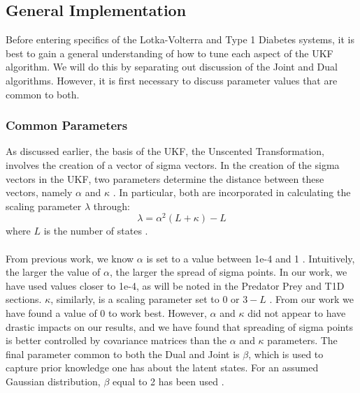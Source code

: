 
\subsection{General Implementation} \label{KF_General_Implementation}
Before entering specifics of the Lotka-Volterra and Type 1 Diabetes systems, it is best to gain a general understanding of how to tune each aspect of the UKF algorithm. We will do this by separating out discussion of the Joint and Dual algorithms. However, it is first necessary to discuss parameter values that are common to both.

\subsubsection{Common Parameters} \label{noise_UKF}
As discussed earlier, the basis of the UKF, the Unscented Transformation, involves the creation of a vector of sigma vectors. In the creation of the sigma vectors in the UKF, two parameters determine the distance between these vectors, namely $\alpha$ and $\kappa$ \cite{VanMereChapter}. In particular, both are incorporated in calculating the scaling parameter $\lambda$ through:
\begin{equation}
\lambda = \alpha^2 (L + \kappa) - L
\end{equation}
where $L$ is the number of states \cite{VanMereChapter}.\\
\\

From previous work, we know $\alpha$ is set to a value between 1e-4 and 1 \cite{VanMereChapter}. Intuitively, the larger the value of $\alpha$, the larger the spread of sigma points. In our work, we have used values closer to 1e-4, as will be noted in the Predator Prey and T1D sections. $\kappa$, similarly, is a scaling parameter set to 0 or $3 - L$ \cite{VanMereChapter}. From our work we have found a value of 0 to work best. However, $\alpha$ and $\kappa$ did not appear to have drastic impacts on our results, and we have found that spreading of sigma points is better controlled by covariance matrices than the $\alpha$ and $\kappa$ parameters. The final parameter common to both the Dual and Joint is $\beta$, which is used to capture prior knowledge one has about the latent states. For an assumed Gaussian distribution, $\beta$ equal to 2 has been used \cite{GoveHollingerDual}.\\

